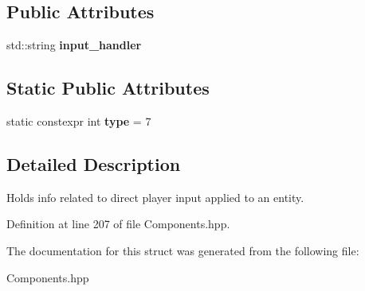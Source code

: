 \subsection*{Public Attributes}
\begin{DoxyCompactItemize}
\item 
std\+::string {\bfseries input\+\_\+handler}\hypertarget{struct_input_component_a4bba759f930669eca328242520f112e7}{}\label{struct_input_component_a4bba759f930669eca328242520f112e7}

\end{DoxyCompactItemize}
\subsection*{Static Public Attributes}
\begin{DoxyCompactItemize}
\item 
static constexpr int {\bfseries type} = 7\hypertarget{struct_input_component_a571a3e30e426f90c372919e7a585b4d9}{}\label{struct_input_component_a571a3e30e426f90c372919e7a585b4d9}

\end{DoxyCompactItemize}


\subsection{Detailed Description}
Holds info related to direct player input applied to an entity. 

Definition at line 207 of file Components.\+hpp.



The documentation for this struct was generated from the following file\+:\begin{DoxyCompactItemize}
\item 
Components.\+hpp\end{DoxyCompactItemize}
